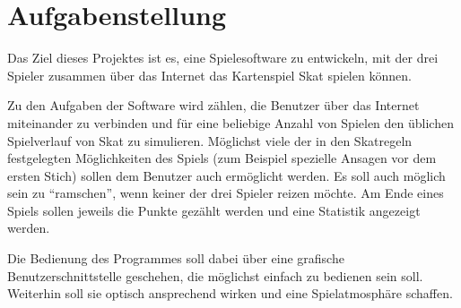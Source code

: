 
\section{Aufgabenstellung}

Das Ziel dieses Projektes ist es, eine Spielesoftware zu entwickeln,
mit der drei Spieler zusammen über das Internet das Kartenspiel Skat
spielen können.

Zu den Aufgaben der Software wird zählen, die Benutzer über das Internet
miteinander zu verbinden und für eine beliebige Anzahl von Spielen
den üblichen Spielverlauf von Skat zu simulieren.
Möglichst viele der in den Skatregeln festgelegten Möglichkeiten
des Spiels (zum Beispiel spezielle Ansagen vor dem ersten Stich)
sollen dem Benutzer auch ermöglicht werden. Es soll auch möglich sein
zu ``ramschen'', wenn keiner der drei Spieler reizen möchte.
Am Ende eines Spiels sollen jeweils die Punkte gezählt werden und
eine Statistik angezeigt werden.

Die Bedienung des Programmes soll dabei über eine grafische 
Benutzerschnittstelle geschehen, die möglichst einfach zu bedienen
sein soll. Weiterhin soll sie optisch ansprechend wirken und eine
Spielatmosphäre schaffen.


